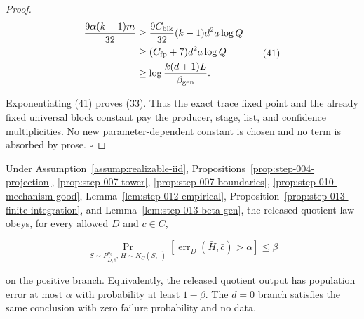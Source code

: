 \begin{proof}
\[
\begin{aligned}
 \frac{9\alpha(k-1)m}{32}
 &\geq\frac{9C_{\rm blk}}{32}(k-1)d^2a\log Q\\
 &\geq(C_{\rm fp}+7)d^2a\log Q\\
 &\geq\log\frac{k(d+1)L}{\beta_{\rm gen}}.
\end{aligned}
 \tag{41}
\]

Exponentiating (41) proves (33). Thus the exact  trace fixed point
and the already fixed universal block constant pay the producer, stage,
list, and confidence multiplicities. No new parameter-dependent constant is
chosen and no term is absorbed by prose. \(\square\)


\end{proof}

\begin{proposition}\label{prop:step-013-pac}
Under Assumption~\ref{assump:realizable-iid}, 
Propositions~\ref{prop:step-004-projection},
\ref{prop:step-007-tower},
\ref{prop:step-007-boundaries},
\ref{prop:step-010-mechanism-good}, Lemma~\ref{lem:step-012-empirical},
Proposition~\ref{prop:step-013-finite-integration}, and
Lemma~\ref{lem:step-013-beta-gen}, the released quotient law obeys, for
every allowed \(D\) and \(c\in C\),

\[
 \Pr_{\bar S\sim P_{\bar D,\bar c}^{n_0},\,
          \bar H\sim K_C(\bar S,\cdot)}
 \left[\operatorname{err}_{\bar D}(\bar H,\bar c)>\alpha\right]
 \leq\beta
 \tag{42}
\]

on the positive branch. Equivalently, the released quotient output has
population error at most \(\alpha\) with probability at least \(1-\beta\).
The  \(d=0\) branch satisfies the same conclusion with zero failure
probability and no data.


\end{proposition}


